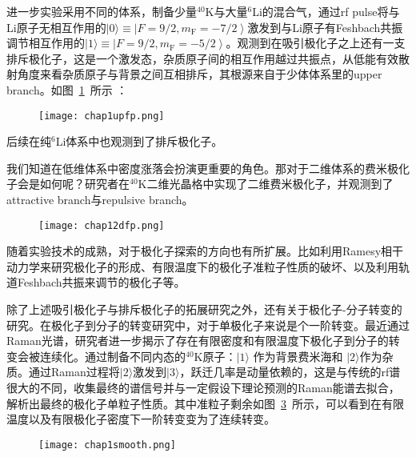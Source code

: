 进一步实验\cite{kohstall2012metastability}采用不同的体系，制备少量${}^{40}$K与大量${}^{6}$Li的混合气，通过rf pulse将与Li原子无相互作用的$|0\rangle\equiv\left|F=9 / 2, m_{\mathrm{F}}=-7 / 2\right\rangle$激发到与Li原子有Feshbach共振调节相互作用的$|1\rangle \equiv\left|F=9 / 2, m_{\mathrm{F}}=-5 / 2\right\rangle$。观测到在吸引极化子之上还有一支排斥极化子，这是一个激发态，杂质原子间的相互作用越过共振点，从低能有效散射角度来看杂质原子与背景之间互相排斥，其根源来自于少体体系里的upper branch。如图~\ref{upfp}~所示 ：
\begin{figure}[!htbp]
    \centering
    \texttt{[image: chap1upfp.png]}
    \label{upfp}
\end{figure}
后续在纯${}^{6}$Li体系中也观测到了排斥极化子\cite{Scazzarepulsive}。

我们知道在低维体系中密度涨落会扮演更重要的角色。那对于二维体系的费米极化子会是如何呢？研究者在${}^{40}$K二维光晶格中实现了二维费米极化子，并观测到了attractive branch与repulsive branch\cite{koschorreck2012attractive}。
\begin{figure}[!htbp]
    \centering
    \texttt{[image: chap12dfp.png]}
    \label{2dfp}
\end{figure}

随着实验技术的成熟，对于极化子探索的方向也有所扩展。比如利用Ramesy相干动力学来研究\cite{Cetina2015decoherence,cetina2016ultrafast}极化子的形成、有限温度下的极化子准粒子性质的破坏\cite{YanBoiling}、以及利用轨道Feshbach共振来调节的极化子等\cite{Darkwah2019}。

除了上述吸引极化子与排斥极化子的拓展研究之外，还有关于极化子-分子转变的研究。在极化子到分子的转变研究中，对于单极化子来说是个一阶转变。最近通过Raman光谱，研究者进一步揭示了存在有限密度和有限温度下极化子到分子的转变会被连续化。通过制备不同内态的${}^{40}$K原子：$|1\rangle$ 作为背景费米海和 $|2\rangle$作为杂质。通过Raman过程将$|2\rangle$激发到$|3\rangle$，跃迁几率是动量依赖的，这是与传统的rf谱很大的不同，收集最终的谱信号并与一定假设下理论预测的Raman能谱去拟合，解析出最终的极化子单粒子性质。其中准粒子剩余如图~\ref{fpsmooth}~所示，可以看到在有限温度以及有限极化子密度下一阶转变变为了连续转变。
\begin{figure}[!htbp]
    \centering
    \texttt{[image: chap1smooth.png]}
    \label{fpsmooth}
\end{figure}



